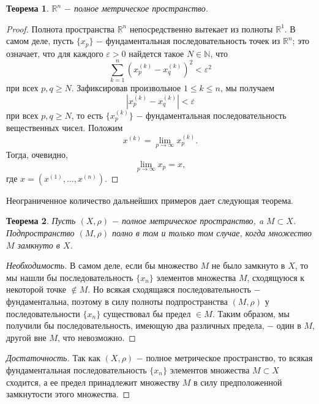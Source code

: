 \documentclass{article}
\newtheorem{theorem}{Теорема}[section]
\begin{document}
\begin{theorem}
\(\mathbb{R} ^ n\) \(-\) полное метрическое пространство.
\end{theorem}

\begin{proof}
Полнота пространства \(\mathbb{R} ^ n\) непосредственно вытекает из полноты \(\mathbb{R} ^ 1\). В самом деле, пусть \(\{x_p\}\) \(-\) фундаментальная последовательность точек из \(\mathbb{R} ^ n\); это означает, что для каждого \(\varepsilon > 0\) найдется такое \(N \in \mathbb{N}\), что
\[
\sum\limits_{k = 1}^{n} {(x_{p}^{(k)} - x_{q}^{(k)})^2} < \varepsilon ^ 2
\]
при всех \(p, q \geq N\). Зафиксировав произвольное \(1 \leq k \leq n\), мы получаем
\[
{|x_{p}^{(k)} - x_{q}^{(k)}|} < \varepsilon
\]
при всех \(p, q \geq N\), то есть \(\{x_p^{(k)}\}\) \(-\) фундаментальная последовательность вещественных чисел. Положим
\[
x^{(k)} = \lim\limits_{p \to \infty} {x_p^{(k)}}.
\]
Тогда, очевидно,
\[
\lim\limits_{p \to \infty} {x_p} = x,
\]
где \(x = (x^{(1)}, ..., x^{(n)})\).
\end{proof}

Неограниченное количество дальнейших примеров дает следующая теорема.

\begin{theorem}
Пусть \((X, \rho)\) \(-\) полное метрическое пространство, a \(M \subset X\). Подпространство \((M, \rho)\) полно в том и только том случае, когда множество \(M\) замкнуто в \(X\).
\end{theorem}

\begin{proof}[Необходимость]
В самом деле, если бы множество \(M\) не было замкнуто в \(X\), то мы нашли бы последовательность \(\{x_n\}\) элементов множества \(M\), сходящуюся к некоторой точке \(\notin M\). Но всякая сходящаяся последовательность \(-\) фундаментальна, поэтому в силу полноты подпространства \((M, \rho)\) у последовательности \(\{x_n\}\) существовал бы предел \(\in M\). Таким образом, мы получили бы последовательность, имеющую два различных предела, \(-\) один в \(M\), другой вне \(M\), что невозможно.
\end{proof}

\begin{proof}[Достаточность]
Так как \((X, \rho)\) \(-\) полное метрическое пространство, то всякая фундаментальная последовательность \(\{x_n\}\) элементов множества \(M \subset X\) сходится, а ее предел принадлежит множеству \(M\) в силу предположенной замкнутости этого множества.
\end{proof}
\end{document}
